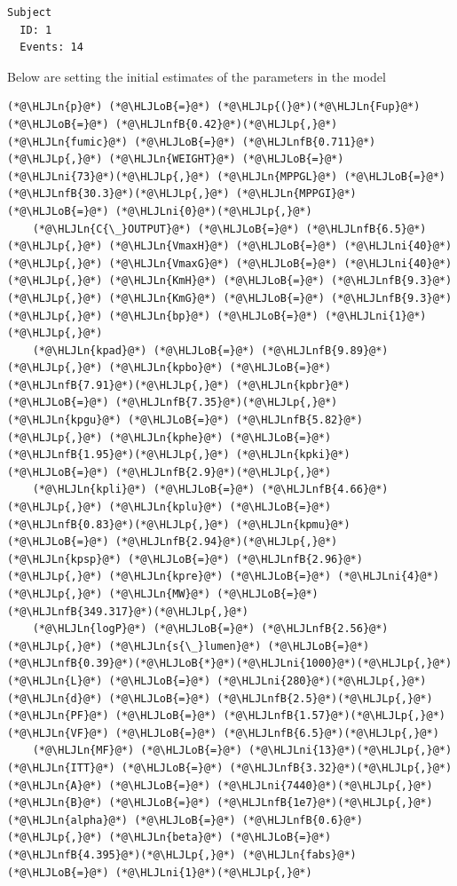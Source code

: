 \documentclass[12pt,a4paper]{article}
\newcommand{\HLJLn}[1]{#1}
\newcommand{\HLJLnfB}[1]{\textcolor[RGB]{59,151,46}{#1}}
\newcommand{\HLJLni}[1]{\textcolor[RGB]{59,151,46}{#1}}
\newcommand{\HLJLoB}[1]{\textcolor[RGB]{102,102,102}{\textbf{#1}}}
\newcommand{\HLJLp}[1]{#1}
\begin{document}
\begin{lstlisting}
Subject
  ID: 1
  Events: 14
\end{lstlisting}


Below are setting the initial estimates of the parameters in the model


\begin{lstlisting}
(*@\HLJLn{p}@*) (*@\HLJLoB{=}@*) (*@\HLJLp{(}@*)(*@\HLJLn{Fup}@*) (*@\HLJLoB{=}@*) (*@\HLJLnfB{0.42}@*)(*@\HLJLp{,}@*) (*@\HLJLn{fumic}@*) (*@\HLJLoB{=}@*) (*@\HLJLnfB{0.711}@*)(*@\HLJLp{,}@*) (*@\HLJLn{WEIGHT}@*) (*@\HLJLoB{=}@*) (*@\HLJLni{73}@*)(*@\HLJLp{,}@*) (*@\HLJLn{MPPGL}@*) (*@\HLJLoB{=}@*) (*@\HLJLnfB{30.3}@*)(*@\HLJLp{,}@*) (*@\HLJLn{MPPGI}@*) (*@\HLJLoB{=}@*) (*@\HLJLni{0}@*)(*@\HLJLp{,}@*)
    (*@\HLJLn{C{\_}OUTPUT}@*) (*@\HLJLoB{=}@*) (*@\HLJLnfB{6.5}@*)(*@\HLJLp{,}@*) (*@\HLJLn{VmaxH}@*) (*@\HLJLoB{=}@*) (*@\HLJLni{40}@*)(*@\HLJLp{,}@*) (*@\HLJLn{VmaxG}@*) (*@\HLJLoB{=}@*) (*@\HLJLni{40}@*)(*@\HLJLp{,}@*) (*@\HLJLn{KmH}@*) (*@\HLJLoB{=}@*) (*@\HLJLnfB{9.3}@*)(*@\HLJLp{,}@*) (*@\HLJLn{KmG}@*) (*@\HLJLoB{=}@*) (*@\HLJLnfB{9.3}@*)(*@\HLJLp{,}@*) (*@\HLJLn{bp}@*) (*@\HLJLoB{=}@*) (*@\HLJLni{1}@*)(*@\HLJLp{,}@*)
    (*@\HLJLn{kpad}@*) (*@\HLJLoB{=}@*) (*@\HLJLnfB{9.89}@*)(*@\HLJLp{,}@*) (*@\HLJLn{kpbo}@*) (*@\HLJLoB{=}@*) (*@\HLJLnfB{7.91}@*)(*@\HLJLp{,}@*) (*@\HLJLn{kpbr}@*) (*@\HLJLoB{=}@*) (*@\HLJLnfB{7.35}@*)(*@\HLJLp{,}@*) (*@\HLJLn{kpgu}@*) (*@\HLJLoB{=}@*) (*@\HLJLnfB{5.82}@*)(*@\HLJLp{,}@*) (*@\HLJLn{kphe}@*) (*@\HLJLoB{=}@*) (*@\HLJLnfB{1.95}@*)(*@\HLJLp{,}@*) (*@\HLJLn{kpki}@*) (*@\HLJLoB{=}@*) (*@\HLJLnfB{2.9}@*)(*@\HLJLp{,}@*)
    (*@\HLJLn{kpli}@*) (*@\HLJLoB{=}@*) (*@\HLJLnfB{4.66}@*)(*@\HLJLp{,}@*) (*@\HLJLn{kplu}@*) (*@\HLJLoB{=}@*) (*@\HLJLnfB{0.83}@*)(*@\HLJLp{,}@*) (*@\HLJLn{kpmu}@*) (*@\HLJLoB{=}@*) (*@\HLJLnfB{2.94}@*)(*@\HLJLp{,}@*) (*@\HLJLn{kpsp}@*) (*@\HLJLoB{=}@*) (*@\HLJLnfB{2.96}@*)(*@\HLJLp{,}@*) (*@\HLJLn{kpre}@*) (*@\HLJLoB{=}@*) (*@\HLJLni{4}@*)(*@\HLJLp{,}@*) (*@\HLJLn{MW}@*) (*@\HLJLoB{=}@*) (*@\HLJLnfB{349.317}@*)(*@\HLJLp{,}@*)
    (*@\HLJLn{logP}@*) (*@\HLJLoB{=}@*) (*@\HLJLnfB{2.56}@*)(*@\HLJLp{,}@*) (*@\HLJLn{s{\_}lumen}@*) (*@\HLJLoB{=}@*) (*@\HLJLnfB{0.39}@*)(*@\HLJLoB{*}@*)(*@\HLJLni{1000}@*)(*@\HLJLp{,}@*) (*@\HLJLn{L}@*) (*@\HLJLoB{=}@*) (*@\HLJLni{280}@*)(*@\HLJLp{,}@*) (*@\HLJLn{d}@*) (*@\HLJLoB{=}@*) (*@\HLJLnfB{2.5}@*)(*@\HLJLp{,}@*) (*@\HLJLn{PF}@*) (*@\HLJLoB{=}@*) (*@\HLJLnfB{1.57}@*)(*@\HLJLp{,}@*) (*@\HLJLn{VF}@*) (*@\HLJLoB{=}@*) (*@\HLJLnfB{6.5}@*)(*@\HLJLp{,}@*)
    (*@\HLJLn{MF}@*) (*@\HLJLoB{=}@*) (*@\HLJLni{13}@*)(*@\HLJLp{,}@*) (*@\HLJLn{ITT}@*) (*@\HLJLoB{=}@*) (*@\HLJLnfB{3.32}@*)(*@\HLJLp{,}@*) (*@\HLJLn{A}@*) (*@\HLJLoB{=}@*) (*@\HLJLni{7440}@*)(*@\HLJLp{,}@*) (*@\HLJLn{B}@*) (*@\HLJLoB{=}@*) (*@\HLJLnfB{1e7}@*)(*@\HLJLp{,}@*) (*@\HLJLn{alpha}@*) (*@\HLJLoB{=}@*) (*@\HLJLnfB{0.6}@*)(*@\HLJLp{,}@*) (*@\HLJLn{beta}@*) (*@\HLJLoB{=}@*) (*@\HLJLnfB{4.395}@*)(*@\HLJLp{,}@*) (*@\HLJLn{fabs}@*) (*@\HLJLoB{=}@*) (*@\HLJLni{1}@*)(*@\HLJLp{,}@*)

\end{lstlisting}
\end{document}
